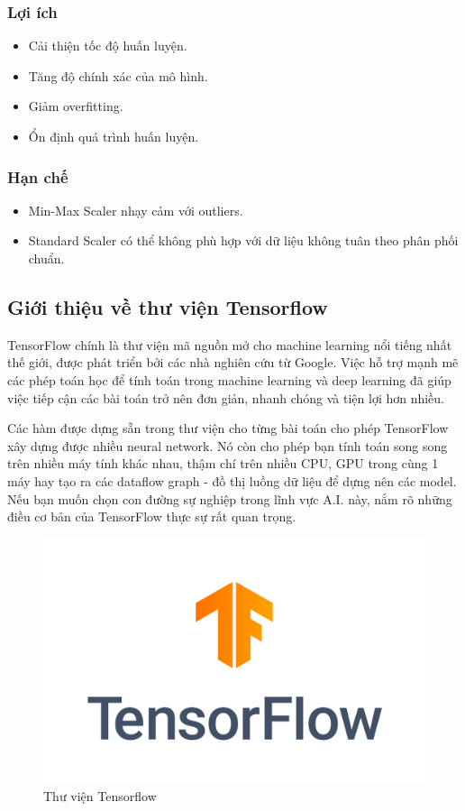 \subsubsection{Lợi ích}
\begin{itemize}
\item Cải thiện tốc độ huấn luyện.
\item Tăng độ chính xác của mô hình.
\item Giảm overfitting.
\item Ổn định quá trình huấn luyện.
\end{itemize}

\subsubsection{Hạn chế}
\begin{itemize}
\item Min-Max Scaler nhạy cảm với outliers.
\item Standard Scaler có thể không phù hợp với dữ liệu không tuân theo phân phối chuẩn.
\end{itemize}

\subsection{Giới thiệu về thư viện Tensorflow}
\indent TensorFlow chính là thư viện mã nguồn mở cho machine learning nổi tiếng nhất thế giới, được phát triển bởi các nhà nghiên cứu từ Google. Việc hỗ trợ mạnh mẽ các phép toán học để tính toán trong machine learning và deep learning đã giúp việc tiếp cận các bài toán trở nên đơn giản, nhanh chóng và tiện lợi hơn nhiều. 

\indent Các hàm được dựng sẵn trong thư viện cho từng bài toán cho phép TensorFlow xây dựng được nhiều neural network. Nó còn cho phép bạn tính toán song song trên nhiều máy tính khác nhau, thậm chí trên nhiều CPU, GPU trong cùng 1 máy hay tạo ra các dataflow graph - đồ thị luồng dữ liệu để dựng nên các model. Nếu bạn muốn chọn con đường sự nghiệp trong lĩnh vực A.I. này, nắm rõ những điều cơ bản của TensorFlow thực sự rất quan trọng.

\begin{figure}[H]
    \centering
    \includegraphics[width=\textwidth,height=\textheight,keepaspectratio]{Images/Theoretical basis/TensorFlow_logo.png}
    \caption{Thư viện Tensorflow}
    \label{fig:enter-label}
\end{figure}

